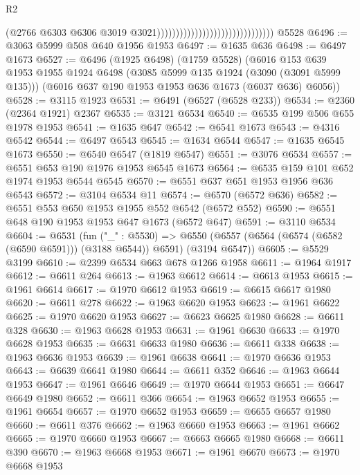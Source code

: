 \begin{lexlean}{R2}
\begin{coremodule}
                                                                (@2766
                                                                  @6303
                                                                  @6306
                                                                  @3019
                                                                  @3021)))))))))))))))))))))))))))))))
    @5528
@6496 := @3063 @5999 @508 @640 @1956 @1953
@6497 := @1635 @636
@6498 := @6497 @1673
@6527 := @6496
    (@1925 @6498)
    (@1759 @5528)
    (@6016
      @153
      @639
      @1953
      @1955
      @1924
      @6498
      (@3085 @5999 @135 @1924 (@3090 (@3091 @5999 @135)))
      (@6016 @637 @190 @1953 @1953 @636 @1673 (@6037 @636) @6056))
@6528 := @3115 @1923
@6531 := @6491 (@6527 (@6528 @233))
@6534 := @2360 (@2364 @1921) @2367
@6535 := @3121 @6534
@6540 := @6535 @199 @506 @655 @1978 @1953
@6541 := @1635 @647
@6542 := @6541 @1673
@6543 := @4316 @6542
@6544 := @6497 @6543
@6545 := @1634 @6544
@6547 := @1635 @6545 @1673
@6550 := @6540 @6547 (@1819 @6547)
@6551 := @3076 @6534
@6557 := @6551 @653 @190 @1976 @1953 @6545 @1673
@6564 := @6535 @159 @101 @652 @1974 @1953 @6544 @6545
@6570 := @6551 @637 @651 @1953 @1956 @636 @6543
@6572 := @3104 @6534 @11
@6574 := @6570 (@6572 @636)
@6582 := @6551 @553 @650 @1953 @1955 @552 @6542 (@6572 @552)
@6590 := @6551 @648 @190 @1953 @1953 @647 @1673 (@6572 @647)
@6591 := @3110 @6534
@6604 := @6531
    (fun ("_" : @5530) =>
    @6550 (@6557 (@6564 (@6574 (@6582 (@6590 @6591))) (@3188 @6544)) @6591) (@3194 @6547))
@6605 := @5529 @3199
@6610 := @2399 @6534 @663 @678 @1266 @1958
@6611 := @1964 @1917
@6612 := @6611 @264
@6613 := @1963 @6612
@6614 := @6613 @1953
@6615 := @1961 @6614
@6617 := @1970 @6612 @1953
@6619 := @6615 @6617 @1980
@6620 := @6611 @278
@6622 := @1963 @6620 @1953
@6623 := @1961 @6622
@6625 := @1970 @6620 @1953
@6627 := @6623 @6625 @1980
@6628 := @6611 @328
@6630 := @1963 @6628 @1953
@6631 := @1961 @6630
@6633 := @1970 @6628 @1953
@6635 := @6631 @6633 @1980
@6636 := @6611 @338
@6638 := @1963 @6636 @1953
@6639 := @1961 @6638
@6641 := @1970 @6636 @1953
@6643 := @6639 @6641 @1980
@6644 := @6611 @352
@6646 := @1963 @6644 @1953
@6647 := @1961 @6646
@6649 := @1970 @6644 @1953
@6651 := @6647 @6649 @1980
@6652 := @6611 @366
@6654 := @1963 @6652 @1953
@6655 := @1961 @6654
@6657 := @1970 @6652 @1953
@6659 := @6655 @6657 @1980
@6660 := @6611 @376
@6662 := @1963 @6660 @1953
@6663 := @1961 @6662
@6665 := @1970 @6660 @1953
@6667 := @6663 @6665 @1980
@6668 := @6611 @390
@6670 := @1963 @6668 @1953
@6671 := @1961 @6670
@6673 := @1970 @6668 @1953

\end{coremodule}
\end{lexlean}
